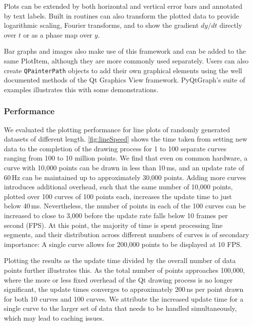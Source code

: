 \documentclass[journal]{vgtc}                %
\begin{document}
Plots can be extended by both horizontal and vertical error bars and annotated by text labels. Built in routines can also transform the plotted data to provide logarithmic scaling, Fourier transforms, and to show the gradient $dy/dt$ directly over $t$ or as a phase map over $y$.

Bar graphs and images also make use of this framework and can be added to the same PlotItem, although they are more commonly used separately. Users can also create \texttt{QPainterPath} objects to add their own graphical elements using the well documented methods of the Qt Graphics View framework. PyQtGraph's suite of examples\cite{pg_examples} illustrates this with some demonstrations.


\subsubsection{Performance}

We evaluated the plotting performance for line plots of randomly generated datasets of different length. \autoref{fig:lineSpeed} shows the time taken from setting new data to the completion of the drawing process for 1 to 100 separate curves ranging from 100 to 10 million points. We find that even on common hardware, a curve with 10,000 points can be drawn in less than 10\,ms, and an update rate of 60\,Hz can be maintained up to approximately 30,000 points. Adding more curves introduces additional overhead, such that the same number of 10,000 points, plotted over 100 curves of 100 points each, increases the update time to just below 40\,ms. Nevertheless, the number of points in each of the 100 curves can be increased to close to 3,000 before the update rate falls below 10 frames per second (FPS). At this point, the majority of time is spent processing line segments, and their distribution across different numbers of curves is of secondary importance: A single curve allows for 200,000 points to be displayed at 10 FPS. 

Plotting the results as the update time divided by the overall number of data points further illustrates this. As the total number of points approaches 100,000, where the more or less fixed overhead of the Qt drawing process is no longer significant, the update times converges to approximately 200\,ns per point drawn for both 10 curves and 100 curves. We attribute the increased update time for a single curve to the larger set of data that needs to be handled simultaneously, which may lead to caching issues.
\end{document}
